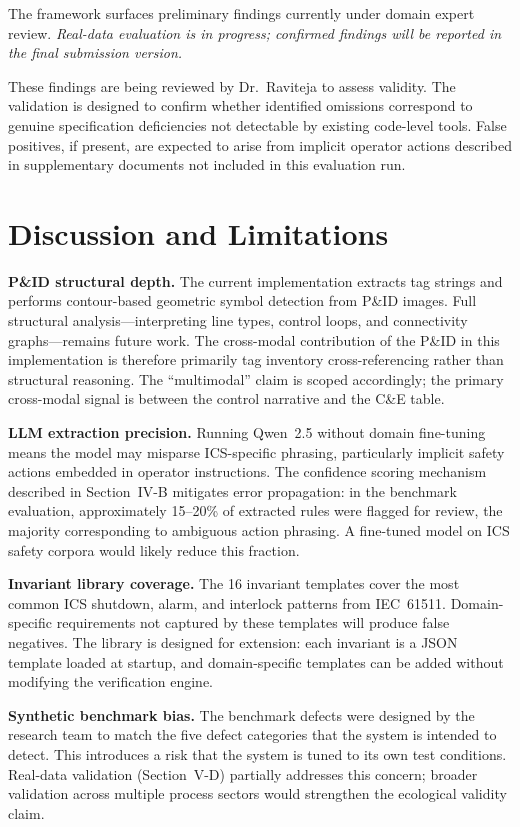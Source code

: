 \documentclass[conference]{IEEEtran}
\begin{document}
The framework surfaces preliminary findings currently under domain
expert review. \emph{Real-data evaluation is in progress; confirmed
findings will be reported in the final submission version.}

These findings are being reviewed by Dr.~Raviteja to assess validity.
The validation is designed to confirm whether identified omissions
correspond to genuine specification deficiencies not detectable by
existing code-level tools. False positives, if present, are expected
to arise from implicit operator actions described in supplementary
documents not included in this evaluation run.

\section{Discussion and Limitations}

\textbf{P\&ID structural depth.} The current implementation extracts tag
strings and performs contour-based geometric symbol detection from P\&ID
images. Full structural analysis---interpreting line types, control loops,
and connectivity graphs---remains future work. The cross-modal contribution
of the P\&ID in this implementation is therefore primarily tag inventory
cross-referencing rather than structural reasoning. The ``multimodal''
claim is scoped accordingly; the primary cross-modal signal is between
the control narrative and the C\&E table.

\textbf{LLM extraction precision.} Running Qwen~2.5 without domain
fine-tuning means the model may misparse ICS-specific phrasing, particularly
implicit safety actions embedded in operator instructions. The confidence
scoring mechanism described in Section~IV-B mitigates error propagation:
in the benchmark evaluation, approximately 15--20\% of extracted rules were flagged
for review, the majority corresponding to ambiguous action phrasing.
A fine-tuned model on ICS safety corpora would likely reduce this fraction.

\textbf{Invariant library coverage.} The 16 invariant templates cover the
most common ICS shutdown, alarm, and interlock patterns from IEC~61511.
Domain-specific requirements not captured by these templates will produce
false negatives. The library is designed for extension: each invariant is
a JSON template loaded at startup, and domain-specific templates can be
added without modifying the verification engine.

\textbf{Synthetic benchmark bias.} The benchmark defects were designed by
the research team to match the five defect categories that the system is
intended to detect. This introduces a risk that the system is tuned to its
own test conditions. Real-data validation (Section~V-D) partially addresses
this concern; broader validation across multiple process sectors would
strengthen the ecological validity claim.
\end{document}
